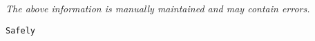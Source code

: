 \label{pkg:safely}

{\tiny \it The above information is manually maintained and may contain errors.}
\begin{verbatim}
Safely
\end{verbatim}
